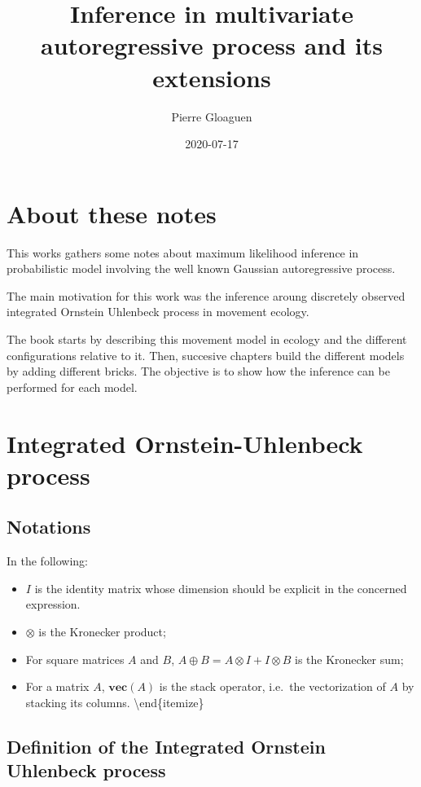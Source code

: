 \documentclass[]{book}
\title{Inference in multivariate autoregressive process and its extensions}
\author{Pierre Gloaguen}
\date{2020-07-17}
\providecommand{\tightlist}{%
  \setlength{\itemsep}{0pt}\setlength{\parskip}{0pt}}
\newcommand{\Vect}[1]{\textbf{vec}\left(#1 \right)}
\begin{document}
\maketitle

{
\setcounter{tocdepth}{1}
\tableofcontents
}
\chapter*{About these notes}\label{about-these-notes}

This works gathers some notes about maximum likelihood inference in
probabilistic model involving the well known Gaussian autoregressive
process.

The main motivation for this work was the inference aroung discretely
observed integrated Ornstein Uhlenbeck process in movement ecology.

The book starts by describing this movement model in ecology and the
different configurations relative to it. Then, succesive chapters build
the different models by adding different bricks. The objective is to
show how the inference can be performed for each model.

\chapter{Integrated Ornstein-Uhlenbeck
process}\label{integrated-ornstein-uhlenbeck-process}

\section{Notations}\label{notations}

In the following:

\begin{itemize}
\tightlist
\item
  \(I\) is the identity matrix whose dimension should be explicit in the
  concerned expression.
\item
  \(\otimes\) is the Kronecker product;
\item
  For square matrices \(A\) and \(B\),
  \(A \oplus B = A\otimes I + I \otimes B\) is the Kronecker sum;
\item
  For a matrix \(A\), \(\Vect A\) is the stack operator, i.e.~the
  vectorization of \(A\) by stacking its columns.
  \textbackslash{}end\{itemize\}
\end{itemize}

\section{Definition of the Integrated Ornstein Uhlenbeck
process}\label{definition-of-the-integrated-ornstein-uhlenbeck-process}
\end{document}

